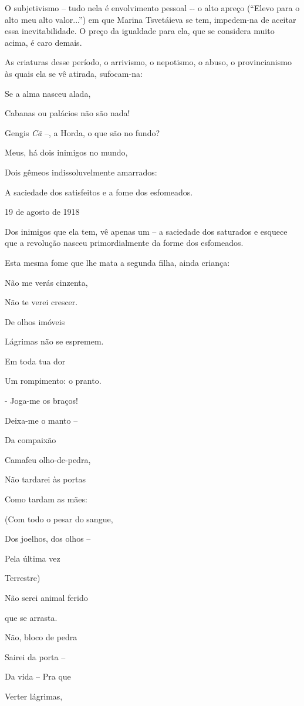 O subjetivismo -- tudo nela é envolvimento pessoal -\/- o alto apreço
(``Elevo para o alto meu alto valor...'') em que Marina Tsvetáieva se
tem, impedem-na de aceitar essa inevitabilidade. O preço da igualdade
para ela, que se considera muito acima, é caro demais.

As criaturas desse período, o arrivismo, o nepotismo, o abuso, o
provincianismo às quais ela se vê atirada, sufocam-na:

Se a alma nasceu alada,

Cabanas ou palácios não são nada!

Gengis \emph{Cã} --, a Horda, o que são no fundo?

Meus, há dois inimigos no mundo,

Dois gêmeos indissoluvelmente amarrados:

A saciedade dos satisfeitos e a fome dos esfomeados.

19 de agosto de 1918

Dos inimigos que ela tem, vê apenas um -- a saciedade dos saturados e
esquece que a revolução nasceu primordialmente da forme dos esfomeados.

Esta mesma fome que lhe mata a segunda filha, ainda criança:

Não me verás cinzenta,

Não te verei crescer.

De olhos imóveis

Lágrimas não se espremem.

Em toda tua dor

Um rompimento: o pranto.

- Joga-me os braços!

Deixa-me o manto --

Da compaixão

Camafeu olho-de-pedra,

Não tardarei às portas

Como tardam as mães:

(Com todo o pesar do sangue,

Dos joelhos, dos olhos --

Pela última vez

Terrestre)

Não serei animal ferido

que se arrasta.

Não, bloco de pedra

Sairei da porta --

Da vida -- Pra que

Verter lágrimas,

